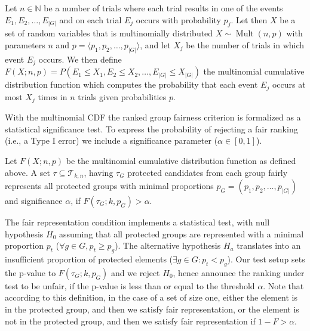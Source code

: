 \begin{definition}
	\label{def:multinomialCDF}
	Let $ n \in \mathbb{N}$ be a number of trials where each trial results in one of the events $ E_1, E_2, \ldots, E_{|G|} $ and on each trial $ E_j $ occurs with probability $ p_j $.
	Let then $X$ %
	be a set of random variables that is multinomially distributed $ X \sim \operatorname{Mult}(n, p)$ with parameters $ n $ and $ p = \langle p_1, p_2, \ldots, p_{|G|} \rangle$, and let $ X_j $ be the number of trials in which event $ E_j $ occurs.
	We then define $ F\left(X; n, p\right) = P\left(E_1 \leq X_1, E_2 \leq X_2, \ldots, E_{|G|} \leq X_{|G|}\right)$ the multinomial cumulative distribution function which computes the probability that each event $ E_j $ occurs at most $ X_j $ times in $ n $ trials given probabilities $ p $.
\end{definition}
With the multinomial CDF the ranked group fairness criterion is formalized as a statistical significance test.
%
To express the probability of rejecting a fair ranking (i.e., a Type I error) we include a significance parameter ($\alpha \in [0,1]$).

\begin{definition}
	\label{def:fair-representation-condition}
	Let $F(X;n,p)$ be the multinomial cumulative distribution function as defined above.
	A set $\tau \subseteq \mathcal{T}_{k,n}$, having $\tau_G$ protected candidates from each group fairly represents all protected groups with minimal proportions $p_G = (p_1, p_2, \ldots, p_{|G|})$ and significance $\alpha$,
	if $F(\tau_G;k,p_G) > \alpha$.
\end{definition}

The fair representation condition implements a statistical test, with null hypothesis $H_0$ assuming that all protected groups are represented with a minimal proportion $p_t$ ($\forall g \in G, p_t \ge p_g$).
%
The alternative hypothesis $H_a$ translates into an insufficient proportion of protected elements ($\exists g \in G: p_t < p_g$). 
%
Our test setup sets the p-value to $F(\tau_G; k, p_G)$ and we reject $H_0$, hence announce the ranking under test to be unfair, if the p-value is less than or equal to the threshold $\alpha$.
%
Note that according to this definition, in the case of a set of size one, either the element is in the protected group, and then we satisfy fair representation, or the element is not in the protected group, and then we satisfy fair representation if $1 - F > \alpha$.

